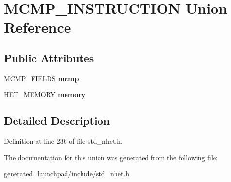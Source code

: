 \hypertarget{unionMCMP__INSTRUCTION}{}\section{M\+C\+M\+P\+\_\+\+I\+N\+S\+T\+R\+U\+C\+T\+I\+ON Union Reference}
\label{unionMCMP__INSTRUCTION}
\subsection*{Public Attributes}
\begin{DoxyCompactItemize}
\item 
\mbox{\label{unionMCMP__INSTRUCTION_ac6c2a2344013a3db697ad51db88840f3}} 
\mbox{\hyperlink{structmcmp__format}{M\+C\+M\+P\+\_\+\+F\+I\+E\+L\+DS}} {\bfseries mcmp}
\item 
\mbox{\label{unionMCMP__INSTRUCTION_a23401bb1fe9d895b84914d2cba0ab81c}} 
\mbox{\hyperlink{structmemory__format}{H\+E\+T\+\_\+\+M\+E\+M\+O\+RY}} {\bfseries memory}
\end{DoxyCompactItemize}


\subsection{Detailed Description}


Definition at line 236 of file std\+\_\+nhet.\+h.



The documentation for this union was generated from the following file\+:\begin{DoxyCompactItemize}
\item 
generated\+\_\+launchpad/include/\mbox{\hyperlink{std__nhet_8h}{std\+\_\+nhet.\+h}}\end{DoxyCompactItemize}
